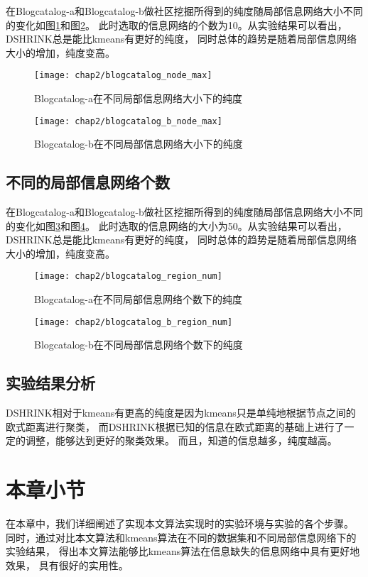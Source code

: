在Blogcatalog-a和Blogcatalog-b做社区挖掘所得到的纯度随局部信息网络大小不同的变化如图\ref{fig:node_max:a}和图\ref{fig:node_max:b}。
此时选取的信息网络的个数为10。从实验结果可以看出，DSHRINK总是能比kmeans有更好的纯度，
同时总体的趋势是随着局部信息网络大小的增加，纯度变高。

\begin{figure}
    \texttt{[image: chap2/blogcatalog\_node\_max]}
    \caption{Blogcatalog-a在不同局部信息网络大小下的纯度}
    \label{fig:node_max:a}
\end{figure}

\begin{figure}
    \texttt{[image: chap2/blogcatalog\_b\_node\_max]}
    \caption{Blogcatalog-b在不同局部信息网络大小下的纯度}
    \label{fig:node_max:b}
\end{figure}

\subsection{不同的局部信息网络个数}
\label{sec:results_region_num}

在Blogcatalog-a和Blogcatalog-b做社区挖掘所得到的纯度随局部信息网络大小不同的变化如图\ref{fig:region_num:a}和图\ref{fig:region_num:b}。
此时选取的信息网络的大小为50。从实验结果可以看出，DSHRINK总是能比kmeans有更好的纯度，
同时总体的趋势是随着局部信息网络大小的增加，纯度变高。

\begin{figure}
    \texttt{[image: chap2/blogcatalog\_region\_num]}
    \caption{Blogcatalog-a在不同局部信息网络个数下的纯度}
    \label{fig:region_num:a}
\end{figure}

\begin{figure}
    \texttt{[image: chap2/blogcatalog\_b\_region\_num]}
    \caption{Blogcatalog-b在不同局部信息网络个数下的纯度}
    \label{fig:region_num:b}
\end{figure}

\subsection{实验结果分析}

DSHRINK相对于kmeans有更高的纯度是因为kmeans只是单纯地根据节点之间的欧式距离进行聚类，
而DSHRINK根据已知的信息在欧式距离的基础上进行了一定的调整，能够达到更好的聚类效果。
而且，知道的信息越多，纯度越高。


\section{本章小节}

在本章中，我们详细阐述了实现本文算法实现时的实验环境与实验的各个步骤。
同时，通过对比本文算法和kmeans算法在不同的数据集和不同局部信息网络下的实验结果，
得出本文算法能够比kmeans算法在信息缺失的信息网络中具有更好地效果，
具有很好的实用性。
